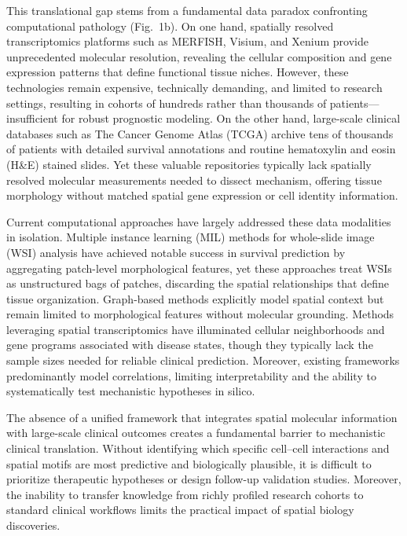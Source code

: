 \documentclass[pdflatex,sn-nature]{sn-jnl}%
\theoremstyle{thmstyleone}%
\theoremstyle{thmstyletwo}%
\theoremstyle{thmstylethree}%
\begin{document}
This translational gap stems from a fundamental data paradox confronting computational pathology (Fig.~1b). On one hand, spatially resolved transcriptomics platforms such as MERFISH\cite{bib44}, Visium\cite{bib38,bib43}, and Xenium\cite{bib45} provide unprecedented molecular resolution, revealing the cellular composition and gene expression patterns that define functional tissue niches\cite{bib3,bib39}. However, these technologies remain expensive, technically demanding, and limited to research settings, resulting in cohorts of hundreds rather than thousands of patients---insufficient for robust prognostic modeling. On the other hand, large-scale clinical databases such as The Cancer Genome Atlas (TCGA)\cite{bib10} archive tens of thousands of patients with detailed survival annotations and routine hematoxylin and eosin (H\&E) stained slides. Yet these valuable repositories typically lack spatially resolved molecular measurements needed to dissect mechanism, offering tissue morphology without matched spatial gene expression or cell identity information.

Current computational approaches have largely addressed these data modalities in isolation. Multiple instance learning (MIL) methods for whole-slide image (WSI) analysis have achieved notable success in survival prediction by aggregating patch-level morphological features\cite{bib4,bib5,bib18,bib52}, yet these approaches treat WSIs as unstructured bags of patches, discarding the spatial relationships that define tissue organization. Graph-based methods explicitly model spatial context\cite{bib6,bib40} but remain limited to morphological features without molecular grounding. Methods leveraging spatial transcriptomics have illuminated cellular neighborhoods and gene programs associated with disease states\cite{bib7,bib8,bib61,bib79}, though they typically lack the sample sizes needed for reliable clinical prediction. Moreover, existing frameworks predominantly model correlations\cite{bib21,bib42,bib77}, limiting interpretability and the ability to systematically test mechanistic hypotheses in silico.

The absence of a unified framework that integrates spatial molecular information with large-scale clinical outcomes creates a fundamental barrier to mechanistic clinical translation. Without identifying which specific cell--cell interactions and spatial motifs are most predictive and biologically plausible, it is difficult to prioritize therapeutic hypotheses or design follow-up validation studies. Moreover, the inability to transfer knowledge from richly profiled research cohorts to standard clinical workflows limits the practical impact of spatial biology discoveries.
\end{document}
